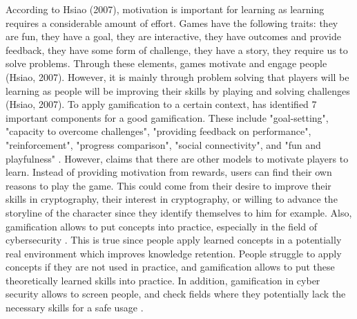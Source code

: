 \documentclass{l4proj}
\begin{document}
According to Hsiao (2007), motivation is important for learning as learning requires a considerable amount of effort. 
Games have the following traits: they are fun, they have a goal, they are interactive, they have outcomes and provide feedback, they have some form of challenge, 
they have a story, they require us to solve problems. Through these elements, games motivate and engage people (Hsiao, 2007). 
However, it is mainly through problem solving that players will be learning as people will be improving their skills by playing and solving challenges (Hsiao, 2007).
To apply gamification to a certain context, \citet{cugelman_gamification:_2013} has identified 7 important components for a good gamification. 
These include "goal-setting", "capacity to overcome challenges", "providing feedback on performance", "reinforcement", "progress comparison", "social connectivity", 
and "fun and playfulness" \citep{cugelman_gamification:_2013}. 
However, \citet{nicholson_recipe_2015} claims that there are other models to motivate players to learn. Instead of providing motivation from rewards, 
users can find their own reasons to play the game. This could come from their desire to improve their skills in cryptography, their interest in cryptography, or 
willing to advance the storyline of the character since they identify themselves to him for example.
Also, gamification allows to put concepts into practice, especially in the field of cybersecurity \citep{wolfenden_gamification_2019}. 
This is true since people apply learned concepts in a potentially real environment which improves knowledge retention. 
People struggle to apply concepts if they are not used in practice, and gamification allows to put these theoretically learned skills into practice.
In addition, gamification in cyber security allows to screen people,
and check fields where they potentially lack the necessary skills for a safe usage \citep{adams_cybersecurity_2015}.
\end{document}
